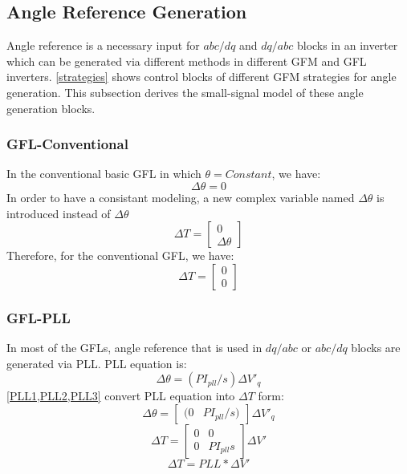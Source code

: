 \subsection{Angle Reference Generation}\label{Inverters}
Angle reference is a necessary input for $abc/dq$ and $dq/abc$ blocks in an inverter which can be generated via different methods in different GFM and GFL inverters. \ref{strategies} shows control blocks of different GFM strategies for angle generation. This subsection derives the small-signal model of these angle generation blocks.

\subsubsection{GFL-Conventional}
In the conventional basic GFL in which $\theta=Constant$, we have:
\begin{equation}\label{thetatot}
 \Delta \theta=0 
\end{equation}
In order to have a consistant modeling, a new complex variable named $\Delta \theta$ is introduced instead of $\Delta \theta$ 
\begin{equation}
 \Delta T=\begin{bmatrix}0 \\ \Delta \theta \end{bmatrix}
\end{equation}
Therefore, for the conventional GFL, we have:
\begin{equation}
\Delta T=\begin{bmatrix}0  \\ 0 \end{bmatrix}
\end{equation}



\subsubsection{GFL-PLL}
In most of the GFLs, angle reference that is used in $dq/abc$ or $abc/dq$ blocks are generated via \gls{PLL}. PLL equation is:
\begin{equation}\label{deltatheta}
    \Delta \theta=(PI_{pll}/s)\Delta V'_q
\end{equation}
 \cref{PLL1,PLL2,PLL3} convert PLL equation into $\Delta T$ form: 
\begin{equation}\label{PLL1}
    \Delta \theta=\begin{bmatrix}(0 & PI_{pll}/s)\end{bmatrix}\Delta V'_q
\end{equation}
\begin{equation}\label{PLL2}
 \Delta T=\begin{bmatrix}0 & 0 \\ 0 & PI_{pll}s\end{bmatrix}\Delta V'   
\end{equation}
\begin{equation}\label{PLL3}
\Delta T=PLL*\Delta V'
\end{equation}




